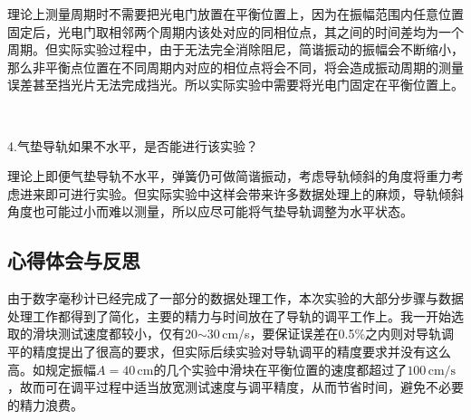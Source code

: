 \documentclass[UTF-8,twoside,cs4size]{ctexart}
\begin{document}
	{\kaishu 理论上测量周期时不需要把光电门放置在平衡位置上，因为在振幅范围内任意位置固定后，光电门取相邻两个周期内该处对应的同相位点，其之间的时间差均为一个周期。但实际实验过程中，由于无法完全消除阻尼，简谐振动的振幅会不断缩小，那么非平衡点位置在不同周期内对应的相位点将会不同，将会造成振动周期的测量误差甚至挡光片无法完成挡光。所以实际实验中需要将光电门固定在平衡位置上。}
	
	~\
	
	4.气垫导轨如果不水平，是否能进行该实验？
	
	{\kaishu 理论上即便气垫导轨不水平，弹簧仍可做简谐振动，考虑导轨倾斜的角度将重力考虑进来即可进行实验。但实际实验中这样会带来许多数据处理上的麻烦，导轨倾斜角度也可能过小而难以测量，所以应尽可能将气垫导轨调整为水平状态。}
	
	\subsection{心得体会与反思}
	由于数字毫秒计已经完成了一部分的数据处理工作，本次实验的大部分步骤与数据处理工作都得到了简化，主要的精力与时间放在了导轨的调平工作上。我一开始选取的滑块测试速度都较小，仅有20$ \sim $30\,cm/s，要保证误差在0.5\%之内则对导轨调平的精度提出了很高的要求，但实际后续实验对导轨调平的精度要求并没有这么高。如规定振幅$ A=40\,\mathrm{cm} $的几个实验中滑块在平衡位置的速度都超过了$ 100\,\mathrm{cm/s} $，故而可在调平过程中适当放宽测试速度与调平精度，从而节省时间，避免不必要的精力浪费。
\end{document}
